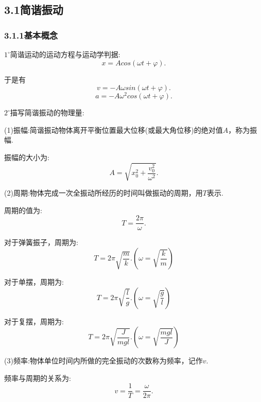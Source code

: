 \documentclass[UTF8]{ctexart}
\begin{document}
	\subsection*{3.1简谐振动}
	\subsubsection*{3.1.1基本概念}
	$1^{\circ}$简谐运动的运动方程与运动学判据:
	\begin{equation*}
		x=Acos(\omega t+\varphi ).
	\end{equation*}

	于是有
	\begin{equation*}
		v=-A\omega sin(\omega t+\varphi ).
	\end{equation*}
	\begin{equation*}
		a=-A\omega^2cos(\omega t+\varphi ).
	\end{equation*}

	$2^{\circ}$描写简谐振动的物理量:
	
	(1)振幅:简谐振动物体离开平衡位置最大位移(或最大角位移)的绝对值$A$，称为振幅.

	振幅的大小为:
	\begin{equation*}
		A=\sqrt{x_0^2+\frac{v_0^2}{\omega^2}}.
	\end{equation*}

	(2)周期:物体完成一次全振动所经历的时间叫做振动的周期，用$T$表示.

	周期的值为:
	\begin{equation*}
		T=\frac{2\pi }{\omega}.
	\end{equation*}

	对于弹簧振子，周期为:
	\begin{equation*}
		T=2\pi \sqrt{\frac{m}{k}}.(\omega=\sqrt{\frac{k}{m}})
	\end{equation*}

	对于单摆，周期为:
	\begin{equation*}
		T=2\pi \sqrt{\frac{l}{g}}.(\omega=\sqrt{\frac{g}{l}})
	\end{equation*}

	对于复摆，周期为:
	\begin{equation*}
		T=2\pi \sqrt{\frac{J}{mgl}}.(\omega=\sqrt{\frac{mgl}{J}})
	\end{equation*}

	(3)频率:物体单位时间内所做的完全振动的次数称为频率，记作$v$.

	频率与周期的关系为:
	\begin{equation*}
		v=\frac{1}{T}=\frac{\omega}{2\pi}.
	\end{equation*}
\end{document}
